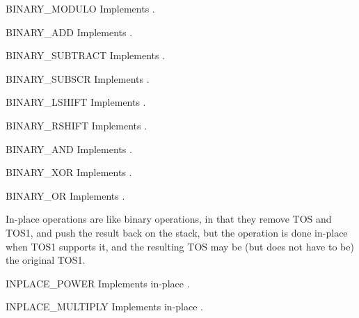 \begin{opcodedesc}{BINARY_MODULO}{}
Implements .
\end{opcodedesc}

\begin{opcodedesc}{BINARY_ADD}{}
Implements .
\end{opcodedesc}

\begin{opcodedesc}{BINARY_SUBTRACT}{}
Implements .
\end{opcodedesc}

\begin{opcodedesc}{BINARY_SUBSCR}{}
Implements .
\end{opcodedesc}

\begin{opcodedesc}{BINARY_LSHIFT}{}
Implements .
\end{opcodedesc}

\begin{opcodedesc}{BINARY_RSHIFT}{}
Implements .
\end{opcodedesc}

\begin{opcodedesc}{BINARY_AND}{}
Implements .
\end{opcodedesc}

\begin{opcodedesc}{BINARY_XOR}{}
Implements .
\end{opcodedesc}

\begin{opcodedesc}{BINARY_OR}{}
Implements .
\end{opcodedesc}

In-place operations are like binary operations, in that they remove TOS and
TOS1, and push the result back on the stack, but the operation is done
in-place when TOS1 supports it, and the resulting TOS may be (but does not
have to be) the original TOS1.

\begin{opcodedesc}{INPLACE_POWER}{}
Implements in-place .
\end{opcodedesc}

\begin{opcodedesc}{INPLACE_MULTIPLY}{}
Implements in-place .
\end{opcodedesc}

